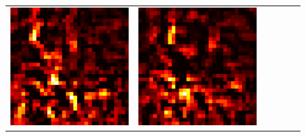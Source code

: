 \documentclass[preprint,12pt]{elsarticle}
\begin{document}
\begin{figure}[p]
\begin{tabular}{cccccc}
  \includegraphics[scale=\scale]{../visualizations/examples/cifar10/cnn/positive_saliency_map/8.png} & 
  \includegraphics[scale=\scale]{../visualizations/examples/cifar10/cnn/negative_saliency_map/8.png} & 

\end{tabular}
\end{figure}
\end{document}
